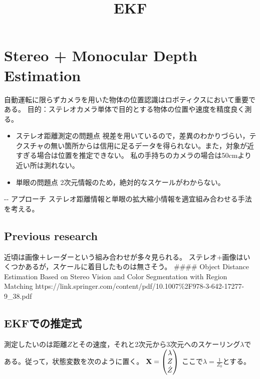 \documentclass[10pt,dvipdfmx,fleqn]{jarticle}
\title{EKF}
\newcommand{\bm}[1]{{\bf #1}}
\newcommand{\mat}[1]{\left( \begin{matrix} #1 \end{matrix} \right)}%
\begin{document}
    
    
    \maketitle
    
    

    

\section{Stereo + Monocular Depth Estimation}
自動運転に限らずカメラを用いた物体の位置認識はロボティクスにおいて重要である。
目的：ステレオカメラ単体で目的とする物体の位置や速度を精度良く測る。

\begin{itemize}
\item
  ステレオ距離測定の問題点
  視差を用いているので，差異のわかりづらい，テクスチャの無い箇所からは信用に足るデータを得られない。また，対象が近すぎる場合は位置を推定できない。
  私の手持ちのカメラの場合は50cmより近い所は測れない。
\item
  単眼の問題点 2次元情報のため，絶対的なスケールがわからない。
\end{itemize}

-\/- アプローチ
ステレオ距離情報と単眼の拡大縮小情報を適宜組み合わせる手法を考える。

\subsection{Previous research}\label{previous-research}

近頃は画像＋レーダーという組み合わせが多々見られる。
ステレオ+画像はいくつかあるが，スケールに着目したものは無さそう。
\#\#\#\# Object Distance Estimation Based on Stereo Vision and Color
Segmentation with Region Matching
https://link.springer.com/content/pdf/10.1007\%2F978-3-642-17277-9\_38.pdf

\subsection{EKFでの推定式}\label{ekfux3067ux306eux63a8ux5b9aux5f0f}

測定したいのは距離\(Z\)とその速度，それと2次元から3次元へのスケーリング\(\lambda\)である。従って，状態変数を次のように置く。
\(\bm{X}= \mat{\lambda \\ Z \\ \dot{Z}}\)
ここで\(\lambda=\frac{1}{Z_0}\)とする。
\end{document}
